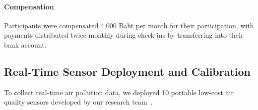 

\paragraph{Compensation}
Participants were compensated 4,000 Baht per month for their participation, with payments distributed twice monthly during check-ins by transferring into their bank account.

\subsection{Real-Time Sensor Deployment and Calibration}

To collect real-time air pollution data, we deployed 10 portable low-cost air quality sensors developed by our research team~\cite{pA2025sensor}.




